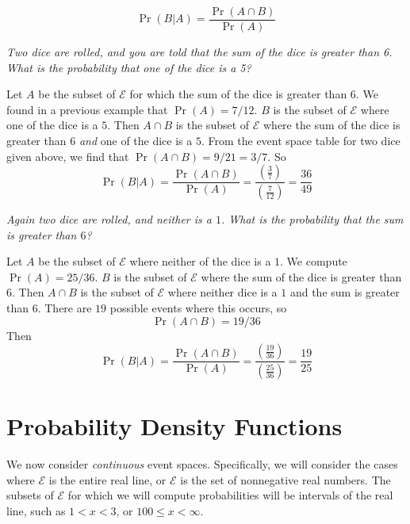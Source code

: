 \noindent
\medskip
\begin{equation}
  \Pr(B|A) = \frac{\Pr(A\cap B)}{\Pr(A)}
\end{equation}
\begin{xexample}
\emph{Two dice are rolled, and you are told that the
sum of the dice is greater than 6.
What is the probability that one of the dice is a 5?}

\medskip
Let $A$ be the subset of $\mathcal{E}$
for which the sum of the dice is greater than
$6$.  We found in a previous example that
$\Pr(A) = 7/12$.
$B$ is the subset of $\mathcal{E}$ where one
of the dice is a $5$.
Then $A\cap B$ is the subset of $\mathcal{E}$
where the sum of the dice is greater than
$6$ \emph{and} one of the dice is a $5$.
From the event space table for two dice given
above, we find that
$\Pr(A\cap B) = 9/21 = 3/7$.
So
\begin{equation}
  \Pr(B|A) = \frac{\Pr(A\cap B)}{\Pr(A)}
    = \frac{\left(\frac{3}{7}\right)}
           {\left(\frac{7}{12}\right)}
    = \frac{36}{49}
\end{equation}
\end{xexample}
%
\begin{xexample}
\emph{Again two dice are rolled, and neither is a $1$.
What is the probability that the sum is greater
than $6$?}

\medskip
Let $A$ be the subset of $\mathcal{E}$
where neither of the dice is a $1$.
We compute $\Pr(A) = 25/36$.
$B$ is the subset of $\mathcal{E}$
where the sum of the dice is greater than $6$.
Then $A\cap B$ is the subset of $\mathcal{E}$
where neither dice is a $1$ and the sum is
greater than $6$.  There are $19$ possible
events where this occurs, so
\begin{equation}
  \Pr(A\cap B) = 19/36
\end{equation}
Then
\begin{equation}
  \Pr(B|A) = \frac{\Pr(A\cap B)}{\Pr(A)}
    = \frac{\left(\frac{19}{36}\right)}
           {\left(\frac{25}{36}\right)}
    = \frac{19}{25}
\end{equation}
\end{xexample}
%
\section{Probability Density Functions}
%
We now consider \emph{continuous} event spaces. Specifically,
we will consider the cases where $\mathcal{E}$ is the entire real line,
or $\mathcal{E}$ is the set of nonnegative real numbers.
The subsets of $\mathcal{E}$ for which we will compute probabilities
will be intervals of the real line, such as $1 < x < 3$, or
$100 \le x < \infty$.

